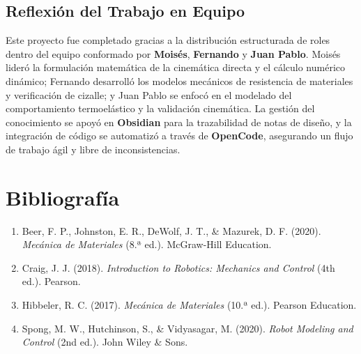 \documentclass[11pt,a4paper]{article}
\begin{document}
\subsection{Reflexión del Trabajo en Equipo}
Este proyecto fue completado gracias a la distribución estructurada de roles dentro del equipo conformado por \textbf{Moisés}, \textbf{Fernando} y \textbf{Juan Pablo}. Moisés lideró la formulación matemática de la cinemática directa y el cálculo numérico dinámico; Fernando desarrolló los modelos mecánicos de resistencia de materiales y verificación de cizalle; y Juan Pablo se enfocó en el modelado del comportamiento termoelástico y la validación cinemática. La gestión del conocimiento se apoyó en \textbf{Obsidian} para la trazabilidad de notas de diseño, y la integración de código se automatizó a través de \textbf{OpenCode}, asegurando un flujo de trabajo ágil y libre de inconsistencias.

\section{Bibliografía}
\begin{enumerate}
    \item Beer, F. P., Johnston, E. R., DeWolf, J. T., \& Mazurek, D. F. (2020). \textit{Mecánica de Materiales} (8.ª ed.). McGraw-Hill Education.
    \item Craig, J. J. (2018). \textit{Introduction to Robotics: Mechanics and Control} (4th ed.). Pearson.
    \item Hibbeler, R. C. (2017). \textit{Mecánica de Materiales} (10.ª ed.). Pearson Education.
    \item Spong, M. W., Hutchinson, S., \& Vidyasagar, M. (2020). \textit{Robot Modeling and Control} (2nd ed.). John Wiley \& Sons.
\end{enumerate}

\newpage

\end{document}
